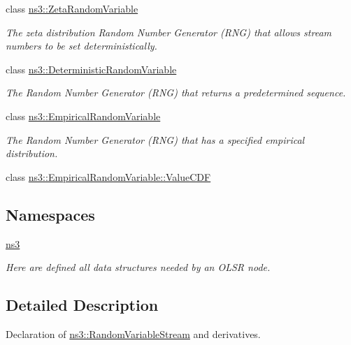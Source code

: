 \begin{DoxyCompactItemize}
class \hyperlink{classns3_1_1ZetaRandomVariable}{ns3\+::\+Zeta\+Random\+Variable}
\begin{DoxyCompactList}\small\item\em The zeta distribution Random Number Generator (R\+NG) that allows stream numbers to be set deterministically. \end{DoxyCompactList}\item 
class \hyperlink{classns3_1_1DeterministicRandomVariable}{ns3\+::\+Deterministic\+Random\+Variable}
\begin{DoxyCompactList}\small\item\em The Random Number Generator (R\+NG) that returns a predetermined sequence. \end{DoxyCompactList}\item 
class \hyperlink{classns3_1_1EmpiricalRandomVariable}{ns3\+::\+Empirical\+Random\+Variable}
\begin{DoxyCompactList}\small\item\em The Random Number Generator (R\+NG) that has a specified empirical distribution. \end{DoxyCompactList}\item 
class \hyperlink{classns3_1_1EmpiricalRandomVariable_1_1ValueCDF}{ns3\+::\+Empirical\+Random\+Variable\+::\+Value\+C\+DF}
\end{DoxyCompactItemize}
\subsection*{Namespaces}
\begin{DoxyCompactItemize}
\item 
 \hyperlink{namespacens3}{ns3}
\begin{DoxyCompactList}\small\item\em Here are defined all data structures needed by an O\+L\+SR node. \end{DoxyCompactList}\end{DoxyCompactItemize}


\subsection{Detailed Description}
Declaration of \hyperlink{classns3_1_1RandomVariableStream}{ns3\+::\+Random\+Variable\+Stream} and derivatives. 